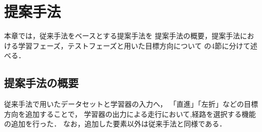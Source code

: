 \chapter{提案手法}\label{chap:method}
本章では，従来手法をベースとする提案手法を
提案手法の概要，提案手法における学習フェーズ，テストフェーズと用いた目標方向について
の4節に分けて述べる．

\section{提案手法の概要}

従来手法で用いたデータセットと学習器の入力へ，
「直進」「左折」などの目標方向を追加することで，
学習器の出力による走行において,経路を選択する機能の追加を行った．
なお，追加した要素以外は従来手法と同様である．



        



